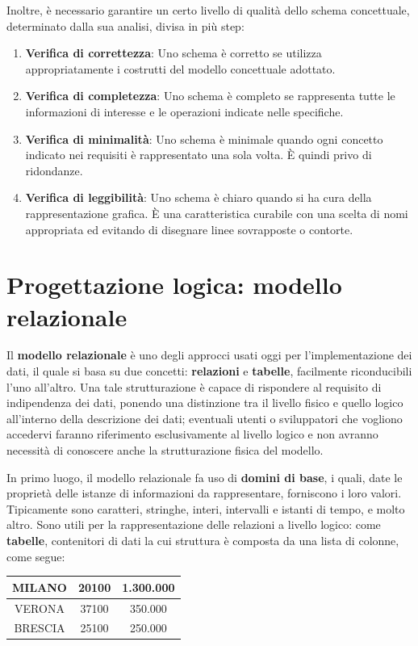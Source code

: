 \noindent Inoltre, è necessario garantire un certo livello di qualità dello schema concettuale, determinato dalla sua analisi, divisa in più step:
\begin{enumerate}
    \item \textbf{Verifica di correttezza}: Uno schema è corretto se utilizza appropriatamente i costrutti del modello concettuale adottato.
    \item \textbf{Verifica di completezza}: Uno schema è completo se rappresenta tutte le informazioni di interesse e le operazioni indicate nelle
        specifiche.
    \item \textbf{Verifica di minimalità}: Uno schema è minimale quando ogni concetto indicato nei requisiti è rappresentato una sola volta. È quindi
        privo di ridondanze.
    \item \textbf{Verifica di leggibilità}: Uno schema è chiaro quando si ha cura della rappresentazione grafica. È una caratteristica curabile con
        una scelta di nomi appropriata ed evitando di disegnare linee sovrapposte o contorte.
\end{enumerate}

%

\section{Progettazione logica: modello relazionale}
Il \textbf{modello relazionale} è uno degli approcci usati oggi per l'implementazione dei dati, il quale si basa su due concetti: \textbf{relazioni} e
\textbf{tabelle}, facilmente riconducibili l'uno all'altro. Una tale strutturazione è capace di rispondere al requisito di indipendenza dei dati,
ponendo una distinzione tra il livello fisico e quello logico all'interno della descrizione dei dati; eventuali utenti o sviluppatori che vogliono
accedervi faranno riferimento esclusivamente al livello logico e non avranno necessità di conoscere anche la strutturazione fisica del modello.\par
In primo luogo, il modello relazionale fa uso di \textbf{domini di base}, i quali, date le proprietà delle istanze di informazioni da rappresentare,
forniscono i loro valori. Tipicamente sono caratteri, stringhe, interi, intervalli e istanti di tempo, e molto altro. Sono utili per la rappresentazione
delle relazioni a livello logico: come \textbf{tabelle}, contenitori di dati la cui struttura è composta da una lista di colonne, come segue:
\begin{table}[h]
    \centering
    \begin{tabular}{|c|c|c|}
        \hline
        MILANO & 20100 & 1.300.000\\
        \hline
        VERONA & 37100 & 350.000\\
        \hline
        BRESCIA & 25100 & 250.000\\
        \hline
    \end{tabular}
\end{table}

